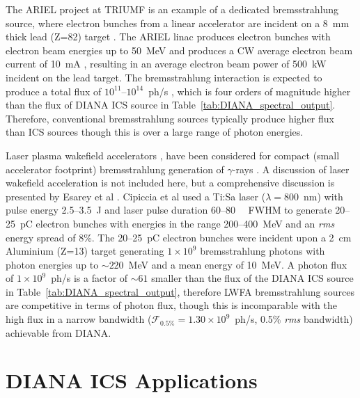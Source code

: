 \documentclass[../main.tex]{subfiles}
\begin{document}
The ARIEL project at TRIUMF \cite{dilling2013ariel} is an example of a dedicated bremsstrahlung source, where electron bunches from a linear accelerator are incident on a 8~\si{\milli\meter} thick lead (Z=82) target \cite{lebois2011simulations}. The ARIEL linac produces electron bunches with electron beam energies up to 50~\si{\mega\electronvolt} and produces a CW average electron beam current of 10~\si{\milli\ampere} \cite{dilling2013ariel}, resulting in an average electron beam power of 500~\si{\kilo\watt} incident on the lead target. The bremsstrahlung interaction is expected to produce a total flux of $10^{11}$--$10^{14}$~ph/\si{\second} \cite{lebois2011simulations}, which is four orders of magnitude higher than the flux of DIANA ICS source in Table~\ref{tab:DIANA_spectral_output}. Therefore, conventional bremsstrahlung sources typically produce higher flux than ICS sources though this is over a large range of photon energies. 

Laser plasma wakefield accelerators \cite{sprangle1988laser,esarey2009physics}, have been considered for compact (small accelerator footprint) bremsstrahlung generation of $\gamma$-rays \cite{cipiccia2012tuneable,lemos2018bremsstrahlung}. A discussion of laser wakefield acceleration is not included here, but a comprehensive discussion is presented by Esarey et al \cite{esarey2009physics}. Cipiccia et al \cite{cipiccia2012tuneable} used a Ti:Sa laser ($\lambda = 800$~\si{\nano\meter}) with pulse energy 2.5--3.5~\si{\joule} and laser pulse duration 60--80~\si{\femto\seconds} FWHM to generate 20--25~\si{\pico\coulomb} electron bunches with energies in the range 200--400~\si{\mega\electronvolt} and an \textit{rms} energy spread of 8\%. The 20--25~\si{\pico\coulomb} electron bunches were incident upon a 2~\si{\centi\meter} Aluminium (Z=13) target generating $1\times 10^{9}$ bremsstrahlung photons with photon energies up to $\sim 220$~\si{\mega\electronvolt} and a mean energy of 10~\si{\mega\electronvolt}. A photon flux of $1\times 10^{9}$~ph/\si{\second} is a factor of $\sim 61$ smaller than the flux of the DIANA ICS source in Table~\ref{tab:DIANA_spectral_output}, therefore LWFA bremsstrahlung sources are competitive in terms of photon flux, though this is incomparable with the high flux in a narrow bandwidth ($\mathcal{F}_{\mathrm{0.5\%}} = 1.30\times 10^{9}$~ph/\si{\second}, 0.5\% \textit{rms} bandwidth) achievable from DIANA.    

\section{DIANA ICS Applications}
\label{sec:DIANA_ICS_applications}
\end{document}
